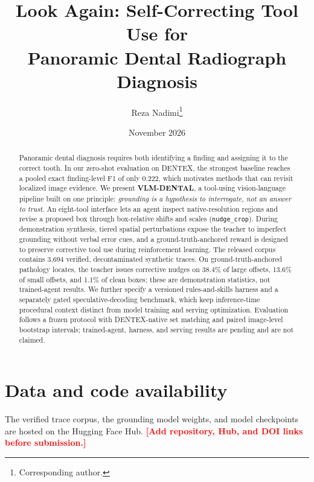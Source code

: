 \documentclass[11pt]{article}
\title{\textbf{Look Again: Self-Correcting Tool Use for\\ Panoramic Dental Radiograph Diagnosis}}
\author{%
  Reza Nadimi\thanks{Corresponding author. \todo{Affiliations and co-author list to be
  finalized.}}
  \quad \todo{Second author name}
  \quad \todo{Third author name}\\[4pt]
  \todo{affiliations}
}
\date{November 2026}
\newcommand{\todo}[1]{\textcolor{red}{\textbf{[#1]}}}
\begin{document}
\maketitle

\begin{abstract}
Panoramic dental diagnosis requires both identifying a finding and assigning it to the
correct tooth. In our zero-shot evaluation on DENTEX, the strongest baseline reaches a pooled
exact finding-level F1 of only 0.222, which motivates methods that can revisit localized image
evidence. We present \textbf{VLM-DENTAL}, a tool-using vision-language pipeline built on one
principle: \emph{grounding is a hypothesis to interrogate, not an answer to trust}.
An eight-tool interface lets an agent inspect native-resolution regions and revise a proposed
box through box-relative shifts and scales (\texttt{nudge\_crop}). During demonstration
synthesis, tiered spatial perturbations expose the teacher to imperfect grounding without
verbal error cues, and a ground-truth-anchored reward is designed to preserve corrective tool
use during reinforcement learning. The released corpus contains 3{,}694 verified,
decontaminated synthetic traces. On ground-truth-anchored pathology locates, the teacher
issues corrective nudges on 38.4\% of large offsets, 13.6\% of small offsets, and 1.1\% of
clean boxes; these are demonstration statistics, not trained-agent results. We further
specify a versioned rules-and-skills harness and a separately gated speculative-decoding
benchmark, which keep inference-time procedural context distinct from model training and
serving optimization. Evaluation follows a frozen protocol with DENTEX-native set matching and
paired image-level bootstrap intervals; trained-agent, harness, and serving results are
pending and are not claimed.
\end{abstract}










\section*{Data and code availability}
The verified trace corpus, the grounding model weights, and model checkpoints are hosted on the
Hugging Face Hub. \todo{Add repository, Hub, and DOI links before submission.}


\FloatBarrier



\appendix

\end{document}
